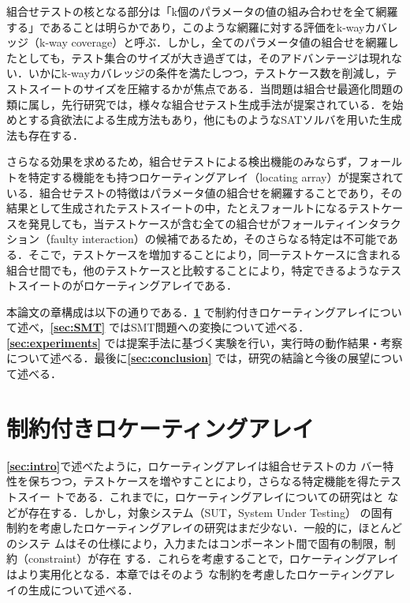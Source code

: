 \documentclass[paper]{ieicej}
\begin{document}
組合せテストの核となる部分は「k個のパラメータの値の組み合わせを全て網羅する」であることは明らかであり，このような網羅に対する評価をk-wayカバレッジ（k-way coverage）と呼ぶ．しかし，全てのパラメータ値の組合せを網羅したとしても，テスト集合のサイズが大き過ぎては，そのアドバンテージは現れない．いかにk-wayカバレッジの条件を満たしつつ，テストケース数を削減し，テストスイートのサイズを圧縮するかが焦点である．当問題は組合せ最適化問題の類に属し，先行研究では，様々な組合せテスト生成手法が提案されている．\cite{AETG}を始めとする貪欲法による生成方法もあり，他にも\cite{SATpairwise}のようなSATソルバを用いた生成法も存在する．

さらなる効果を求めるため，組合せテストによる検出機能のみならず，フォールトを特定する機能をも持つロケーティングアレイ（locating array）が提案されている\cite{colbourn}．組合せテストの特徴はパラメータ値の組合せを網羅することであり，その結果として生成されたテストスイートの中，たとえフォールトになるテストケースを発見しても，当テストケースが含む全ての組合せがフォールティインタラクション（faulty interaction）の候補であるため，そのさらなる特定は不可能である．そこで，テストケースを増加することにより，同一テストケースに含まれる組合せ間でも，他のテストケースと比較することにより，特定できるようなテストスイートのがロケーティングアレイである．

本論文の章構成は以下の通りである．{\bfseries \ref{sec:cla}} で制約付きロケーティングアレイについて述べ，{\bfseries \ref{sec:SMT}} ではSMT問題への変換について述べる．{\bfseries \ref{sec:experiments}} では提案手法に基づく実験を行い，実行時の動作結果・考察について述べる．最後に{\bfseries \ref{sec:conclusion}} では，研究の結論と今後の展望について述べる．

\section{制約付きロケーティングアレイ}
\label{sec:cla}

{\bfseries \ref{sec:intro}}で述べたように，ロケーティングアレイは組合せテストのカ
バー特性を保ちつつ，テストケースを増やすことにより，さらなる特定機能を得たテストスイー
トである．これまでに，ロケーティングアレイについての研究は\cite{KonishiSAT}と
\cite{Nagamoto}などが存在する．しかし，対象システム（SUT，System Under Testing）
の固有制約を考慮したロケーティングアレイの研究はまだ少ない．一般的に，ほとんどのシステ
ムはその仕様により，入力またはコンポーネント間で固有の制限，制約（constraint）が存在
する．これらを考慮することで，ロケーティングアレイはより実用化となる．本章ではそのよう
な制約を考慮したロケーティングアレイの生成について述べる．
\end{document}
